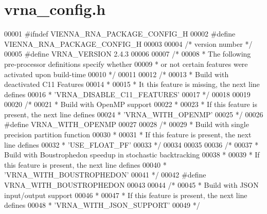 \hypertarget{vrna__config_8h_source}{}\section{vrna\+\_\+config.\+h}
\label{vrna__config_8h_source}

\begin{DoxyCode}
00001 \textcolor{preprocessor}{#ifndef VIENNA\_RNA\_PACKAGE\_CONFIG\_H}
00002 \textcolor{preprocessor}{#define VIENNA\_RNA\_PACKAGE\_CONFIG\_H}
00003 
00004 \textcolor{comment}{/* version number */}
00005 \textcolor{preprocessor}{#define VRNA\_VERSION  2.4.3}
00006 
00007 \textcolor{comment}{/*}
00008 \textcolor{comment}{ * The following pre-processor definitions specify whether}
00009 \textcolor{comment}{ * or not certain features were activated upon build-time}
00010 \textcolor{comment}{ */}
00011 
00012 \textcolor{comment}{/*}
00013 \textcolor{comment}{ * Build with deactivated C11 Features}
00014 \textcolor{comment}{ *}
00015 \textcolor{comment}{ * It this feature is missing, the next line defines}
00016 \textcolor{comment}{ * 'VRNA\_DISABLE\_C11\_FEATURES'}
00017 \textcolor{comment}{ */}
00018 
00019 
00020 \textcolor{comment}{/*}
00021 \textcolor{comment}{ * Build with OpenMP support}
00022 \textcolor{comment}{ *}
00023 \textcolor{comment}{ * If this feature is present, the next line defines}
00024 \textcolor{comment}{ * 'VRNA\_WITH\_OPENMP'}
00025 \textcolor{comment}{ */}
00026 \textcolor{preprocessor}{#define VRNA\_WITH\_OPENMP}
00027 
00028 \textcolor{comment}{/*}
00029 \textcolor{comment}{ * Build with single precision partition function}
00030 \textcolor{comment}{ *}
00031 \textcolor{comment}{ * If this feature is present, the next line defines}
00032 \textcolor{comment}{ * 'USE\_FLOAT\_PF'}
00033 \textcolor{comment}{ */}
00034 
00035 
00036 \textcolor{comment}{/*}
00037 \textcolor{comment}{ * Build with Boustrophedon speedup in stochastic backtracking}
00038 \textcolor{comment}{ *}
00039 \textcolor{comment}{ * If this feature is present, the next line defines}
00040 \textcolor{comment}{ * 'VRNA\_WITH\_BOUSTROPHEDON'}
00041 \textcolor{comment}{ */}
00042 \textcolor{preprocessor}{#define VRNA\_WITH\_BOUSTROPHEDON}
00043 
00044 \textcolor{comment}{/*}
00045 \textcolor{comment}{ * Build with JSON input/output support}
00046 \textcolor{comment}{ *}
00047 \textcolor{comment}{ * If this feature is present, the next line defines}
00048 \textcolor{comment}{ * 'VRNA\_WITH\_JSON\_SUPPORT'}
00049 \textcolor{comment}{ */}

\end{DoxyCode}
